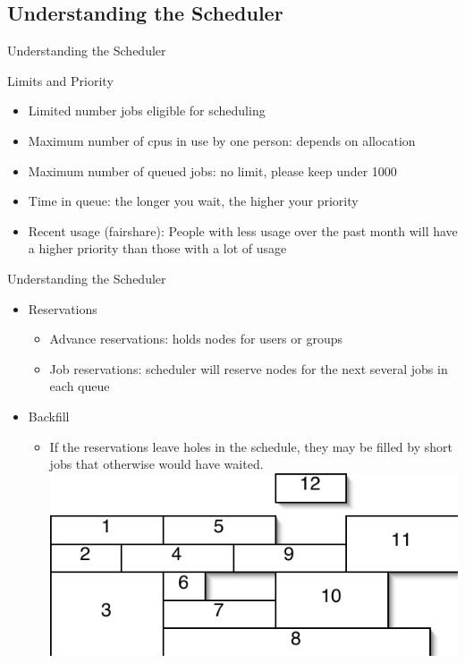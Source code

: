 \documentclass[handout]{beamer}
\begin{document}
\subsection{Understanding the Scheduler}
\begin{frame}{Understanding the Scheduler}
   \begin{block}{Limits and Priority}
    \begin{itemize}
    \item<1-> Limited number jobs eligible for scheduling
    \item<1-> Maximum number of cpus in use by one person: depends on allocation
    \item<1-> Maximum number of queued jobs: no limit, please keep under 1000
    \end{itemize}
    \begin{itemize}
    \item<2-> Time in queue: the longer you wait, the higher your priority
    \item<2-> Recent usage (fairshare): People with less usage over the past month will have a higher priority than those with a lot of usage

    \end{itemize}
   \end{block}
\end{frame}
\begin{frame}{Understanding the Scheduler}
  \begin{itemize}
  \item<1-> Reservations
    \begin{itemize}
    \item<1-> Advance reservations: holds nodes for users or groups
    \item<1-> Job reservations: scheduler will reserve nodes for the next
several jobs in each queue
    \end{itemize}
  \item<2-> Backfill
    \begin{itemize}
    \item<2-> If the reservations leave holes in the schedule, they may be
filled by short jobs that otherwise would have waited.\\
	\includegraphics{job-grid}
    \end{itemize}
  \end{itemize}
\end{frame}
\end{document}
